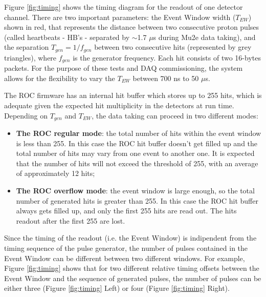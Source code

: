     Figure \ref{fig:timing} shows the timing diagram 
    for the readout of one detector channel.
    There are two important parameters: 
    the Event Window width ($T_{EW}$) shown in red, 
    that represents the distance between two consecutive 
    proton pulses (called heartbeats - HB's - separated by 
    $\sim$1.7 $\mu$s during Mu2e data taking), and 
    the separation $T_{gen}=1/f_{gen}$ between 
    two consecutive hits (represented by grey triangles), 
    where $f_{gen}$ is the generator frequency. 
    Each hit consists of two 16-bytes packets.
    For the purpose of these tests and DAQ commissioning, 
    the system allows for the flexibility to vary 
    the $T_{EW}$ between 700 ns to 50 
    $\mu$s. 

    The ROC firmware has an internal hit buffer 
    which stores up to 255 hits, which is adequate 
    given the expected hit multiplicity 
    in the detectors at run time. 
    Depending on $T_{gen}$ and $T_{EW}$, the data 
    taking can proceed in two different modes:
    \begin{itemize}
      \item \textbf{The ROC regular mode}: the total number of hits 
      within the event window is less than 255.
      In this case the ROC hit buffer doesn't get filled up 
      and the total number of 
      hits may vary from one event to another one. It is 
      expected that the number 
      of hits will not exceed the threshold of 255, 
      with an average of approximately 12 hits;
    \item \textbf{The ROC overflow mode}: the event window 
    is large enough, 
    so the total number of generated hits is 
      greater than 255. In this case
      the ROC hit buffer always gets filled up, and only 
      the first 255 hits are read out. 
      The hits readout after the first 255 are lost.
    \end{itemize}
   
    Since the timing of the readout (i.e. the Event Window) 
    is indipendent from the timing sequence 
    of the pulse generator, the number of pulses contained in 
    the Event Window can be different between two different 
    windows. 
    For example, Figure \ref{fig:timing} shows 
    that for two different relative timing offsets between 
    the Event Window and the sequence of generated pulses, 
    the number of pulses can be 
    either three (Figure \ref{fig:timing} Left) 
    or four (Figure \ref{fig:timing} Right).

